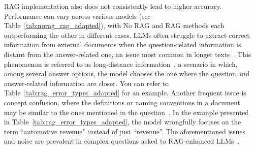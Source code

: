 \documentclass{DESSThesis}
\begin{document}
RAG implementation also does not consistently lead to higher accuracy. Performance can vary across various models (see Table~\ref{tab:norag_rag_adapted}), with No RAG and RAG methods each outperforming the other in different cases. LLMs often struggle to extract correct information from external documents when the question-related information is distant from the answer-related one, an issue most common in longer texts~\cite{Chen_Lin_Han_Sun_2024}. This phenomenon is referred to as long-distance information~\cite{Chen_Lin_Han_Sun_2024}, a scenario in which, among several answer options, the model chooses the one where the question and answer-related information are closer. You can refer to Table~\ref{tab:rag_error_types_adapted} for an example. Another frequent issue is concept confusion, where the definitions or naming conventions in a document may be similar to the ones mentioned in the question~\cite{Chen_Lin_Han_Sun_2024}. In the example presented in Table~\ref{tab:rag_error_types_adapted}, the model wrongfully focuses on the term \enquote{automotive revenue} instead of just \enquote{revenue}. The aforementioned issues and noise are prevalent in complex questions asked to RAG-enhanced LLMs~\cite{Chen_Lin_Han_Sun_2024}.
\end{document}
